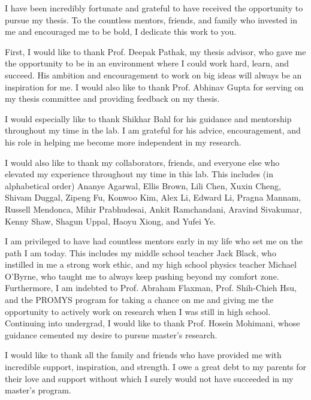 \documentclass[12pt]{cmuthesis}
\begin{document}
\begin{acknowledgments}
  I have been incredibly fortunate and grateful to have 
  received the opportunity to pursue
  my thesis. To the countless mentors, friends, and
  family who invested in me and encouraged me to be 
  bold, I dedicate this work to you.

  First, I would like to thank Prof. Deepak Pathak, my 
  thesis  advisor, who gave me the opportunity to be 
  in an environment where I could work hard, learn, 
  and succeed. His ambition and encouragement to work
  on big ideas will always be an inspiration for me. 
  I would also like to thank Prof. Abhinav Gupta for
  serving on my thesis committee and providing feedback
  on my thesis.

  I would especially like to thank Shikhar Bahl for his
  guidance and mentorship throughout my time in the lab. 
  I am grateful for his advice, encouragement, and his role
  in helping me become more independent in my research.

  I would also like to thank my collaborators, friends, 
  and everyone else who elevated my experience throughout
  my time in this lab. This includes (in alphabetical order)
  Ananye Agarwal, Ellis Brown, Lili Chen, Xuxin Cheng,
  Shivam Duggal, Zipeng Fu, Konwoo Kim, Alex Li, Edward Li, 
  Pragna Mannam, Russell Mendonca, Mihir Prabhudesai,
  Ankit Ramchandani, Aravind Sivakumar, Kenny Shaw, 
  Shagun Uppal, Haoyu Xiong, and Yufei Ye.

  I am privileged to have had countless mentors early in
  my life who set me on the path I am today. This 
  includes my middle school teacher Jack Black, who 
  instilled in me a strong work ethic, and my high school 
  physics teacher Michael O'Byrne, who taught me to always
  keep pushing beyond my comfort zone. Furthermore, I 
  am indebted to Prof. Abraham Flaxman, Prof. Shih-Chieh
  Hsu, and the PROMYS program for taking a chance on me
  and giving me the opportunity to actively work on 
  research when I was still in high school. Continuing 
  into undergrad, I would like to thank Prof. Hosein 
  Mohimani, whose guidance cemented my 
  desire to pursue master's research.

  I would like to thank all the family and friends who 
  have provided me with incredible support, inspiration,
  and strength. I owe a great debt to my parents for their
  love and support without which I surely would not have
  succeeded in my master's program.
\end{acknowledgments}
\end{document}

